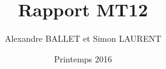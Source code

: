 \documentclass[a4paper,12pt]{report}
\begin{document}
\title{Rapport  MT12}
\author{Alexandre BALLET et Simon LAURENT}
\date{Printemps 2016}
   
\maketitle

\tableofcontents

\end{document}
